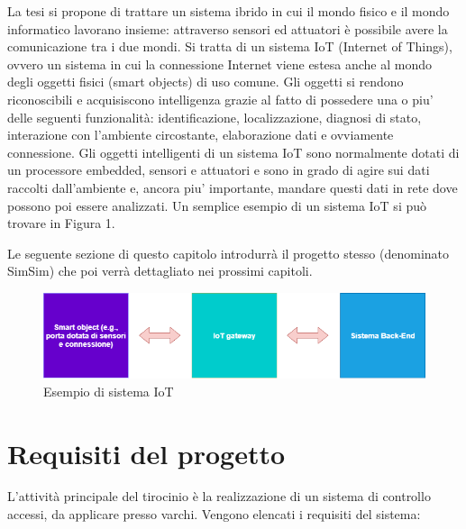 \documentclass[12pt]{report}
\begin{document}
La tesi si propone di trattare un sistema ibrido in cui il mondo fisico e il mondo informatico lavorano insieme: attraverso sensori ed attuatori è possibile avere la comunicazione tra i due mondi. 
Si tratta di un sistema IoT (Internet of Things), ovvero un sistema in cui la connessione Internet viene estesa anche al mondo degli oggetti fisici (smart objects\cite{smart_objects}) di uso comune. Gli oggetti si rendono riconoscibili e acquisiscono intelligenza grazie al fatto di possedere una o piu' delle seguenti funzionalità: identificazione, localizzazione, diagnosi di stato, interazione con l'ambiente circostante, elaborazione dati e ovviamente connessione.
Gli oggetti intelligenti di un sistema IoT sono normalmente dotati di un processore embedded, sensori e attuatori e sono in grado di agire sui dati raccolti dall'ambiente e, ancora piu' importante, mandare questi dati in rete dove possono poi essere analizzati\cite{IoT}. Un semplice esempio di un sistema IoT si può trovare in Figura 1.

Le seguente sezione di questo capitolo introdurrà il progetto stesso (denominato SimSim) che poi verrà dettagliato nei prossimi capitoli.

\begin{figure}
	\includegraphics[width=\linewidth]{./img/iot_diagram.png}
	\caption{Esempio di sistema IoT}
	\label{fig:iot1}
\end{figure}

%
\section{Requisiti del progetto}
%

L'attività principale del tirocinio è la realizzazione di un sistema di controllo accessi, da applicare presso varchi. Vengono elencati i requisiti del sistema:
\end{document}
